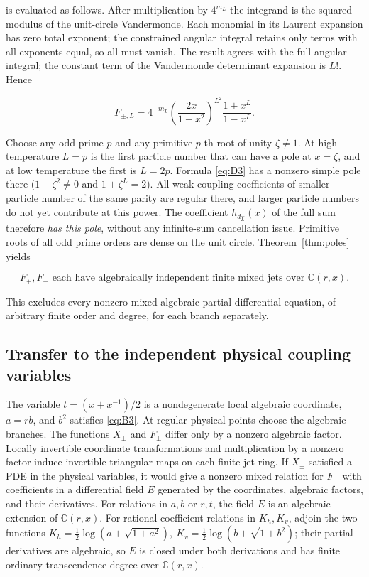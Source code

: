 \documentclass[11pt,a4paper]{article}
\numberwithin{equation}{section}
\theoremstyle{plain}
\theoremstyle{definition}
\begin{document}
is evaluated as follows. After multiplication by \(4^{m_L}\) the integrand is the squared modulus of the unit-circle Vandermonde. Each monomial in its Laurent expansion has zero total exponent; the constrained angular integral retains only terms with all exponents equal, so all must vanish. The result agrees with the full angular integral; the constant term of the Vandermonde determinant expansion is \(L!\). Hence

\begin{equation}
[r^{d_L^\pm}]F_{\pm,L}=4^{-m_L}\left(\frac{2x}{1-x^2}\right)^{L^2}\frac{1+x^L}{1-x^L}.
\label{eq:D3}
\end{equation}

Choose any odd prime \(p\) and any primitive \(p\)-th root of unity \(\zeta\ne1\). At high temperature \(L=p\) is the first particle number that can have a pole at \(x=\zeta\), and at low temperature the first is \(L=2p\). Formula \eqref{eq:D3} has a nonzero simple pole there (\(1-\zeta^2\ne0\) and \(1+\zeta^L=2\)). All weak-coupling coefficients of smaller particle number of the same parity are regular there, and larger particle numbers do not yet contribute at this power. The coefficient \(h_{d_L^\pm}(x)\) of the full sum therefore \emph{has this pole}, without any infinite-sum cancellation issue. Primitive roots of all odd prime orders are dense on the unit circle. Theorem~\ref{thm:poles} yields

\begin{equation}
F_+,F_- \text{ each have algebraically independent finite mixed jets over }\mathbb C(r,x).
\label{eq:D4}
\end{equation}

This excludes every nonzero mixed algebraic partial differential equation, of arbitrary finite order and degree, for each branch separately.

\subsection{Transfer to the independent physical coupling variables}\label{sec:transfer}

The variable \(t=(x+x^{-1})/2\) is a nondegenerate local algebraic coordinate, \(a=rb\), and \(b^2\) satisfies \eqref{eq:B3}. At regular physical points choose the algebraic branches. The functions \(X_\pm\) and \(F_\pm\) differ only by a nonzero algebraic factor. Locally invertible coordinate transformations and multiplication by a nonzero factor induce invertible triangular maps on each finite jet ring. If \(X_\pm\) satisfied a PDE in the physical variables, it would give a nonzero mixed relation for \(F_\pm\) with coefficients in a differential field \(E\) generated by the coordinates, algebraic factors, and their derivatives. For relations in \(a,b\) or \(r,t\), the field \(E\) is an algebraic extension of \(\mathbb C(r,x)\). For rational-coefficient relations in \(K_h,K_v\), adjoin the two functions \(K_h=\tfrac12\log(a+\sqrt{1+a^2}),\ K_v=\tfrac12\log(b+\sqrt{1+b^2})\); their partial derivatives are algebraic, so \(E\) is closed under both derivations and has finite ordinary transcendence degree over \(\mathbb C(r,x)\).
\end{document}
